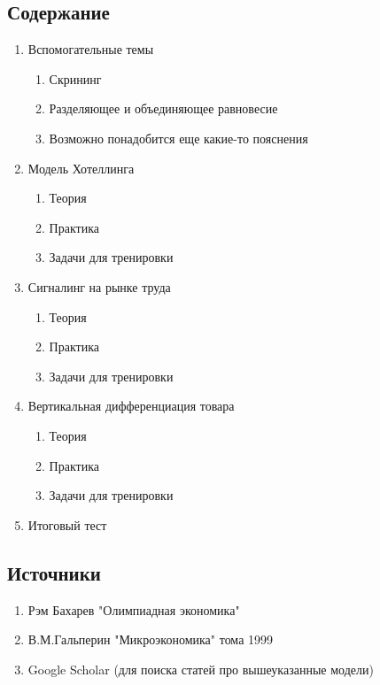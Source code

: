 \subsection{Содержание}
\begin{enumerate}
    \item Вспомогательные темы \begin{enumerate}
            \item Скрининг
            \item Разделяющее и объединяющее равновесие
            \item Возможно понадобится еще какие-то пояснения
        \end{enumerate}
    \item Модель Хотеллинга \begin{enumerate}
            \item Теория
            \item Практика
            \item Задачи для тренировки
        \end{enumerate}
    \item Сигналинг на рынке труда \begin{enumerate}
            \item Теория
            \item Практика
            \item Задачи для тренировки
        \end{enumerate}
    \item Вертикальная дифференциация товара \begin{enumerate}
            \item Теория
            \item Практика
            \item Задачи для тренировки
        \end{enumerate}
    \item Итоговый тест
\end{enumerate}
\subsection{Источники}
\begin{enumerate}
    \item Рэм Бахарев "Олимпиадная экономика"
    \item В.М.Гальперин "Микроэкономика" тома 1999
    \item Google Scholar (для поиска статей про вышеуказанные модели)
\end{enumerate}

